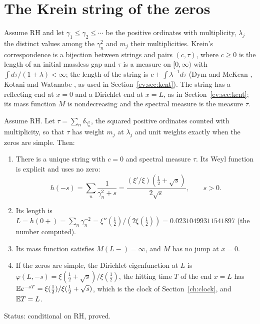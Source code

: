 \section{The Krein string of the zeros}\label{bk:sec:string}

Assume RH and let $\gamma_1\le\gamma_2\le\cdots$ be the positive ordinates with multiplicity, $\lambda_j$ the distinct values among the $\gamma_n^2$ and $m_j$ their multiplicities. Krein's correspondence is a bijection between strings and pairs $(c,\tau)$, where $c\ge0$ is the length of an initial massless gap and $\tau$ is a measure on $[0,\infty)$ with $\int d\tau/(1+\lambda)<\infty$; the length of the string is $c+\int\lambda^{-1}d\tau$ (Dym and McKean \cite{DymMcKean76}, Kotani and Watanabe \cite{KotaniWatanabe82}, as used in Section~\ref{ev:sec:kent}). The string has a reflecting end at $x=0$ and a Dirichlet end at $x=L$, as in Section~\ref{ev:sec:kent}; its mass function $M$ is nondecreasing and the spectral measure is the measure $\tau$.

\begin{theorem}[conditional on RH]\label{bk:thm:string}
Assume RH. Let $\tau=\sum_n\delta_{\gamma_n^2}$, the squared positive ordinates counted with multiplicity, so that $\tau$ has weight $m_j$ at $\lambda_j$ and unit weights exactly when the zeros are simple. Then:
\begin{enumerate}
\item[(a)] There is a unique string with $c=0$ and spectral measure $\tau$. Its Weyl function is explicit and uses no zero:
\[
h(-s)=\sum_n\frac1{\gamma_n^2+s}=\frac{(\xi'/\xi)(\frac12+\sqrt s)}{2\sqrt s},\qquad s>0.
\]
\item[(b)] Its length is $L=h(0+)=\sum_n\gamma_n^{-2}=\xi''(\frac12)/(2\xi(\frac12))=0.02310499311541897$ (the number computed).
\item[(c)] Its mass function satisfies $M(L-)=\infty$, and $M$ has no jump at $x=0$.
\item[(d)] If the zeros are simple, the Dirichlet eigenfunction at $L$ is $\varphi(L,-s)=\xi(\frac12+\sqrt s)/\xi(\frac12)$, the hitting time $T$ of the end $x=L$ has $\mathbb{E} e^{-sT}=\xi(\frac12)/\xi(\frac12+\sqrt s)$, which is the clock of Section~\ref{ch:clock}, and $\mathbb{E} T=L$.
\end{enumerate}
Status: conditional on RH, proved.
\end{theorem}

